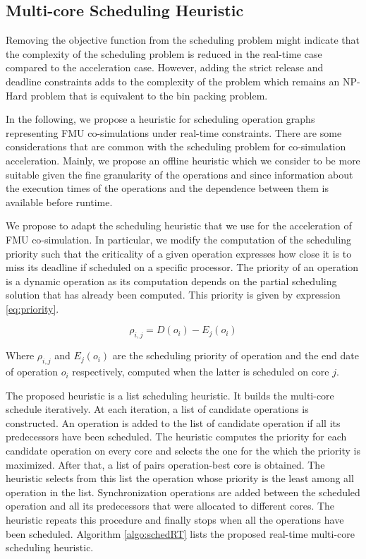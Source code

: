 \subsection{Multi-core Scheduling Heuristic}

Removing the objective function from the scheduling problem might indicate that the complexity of the scheduling problem is reduced in the real-time case compared to the acceleration case. However, adding the strict release and deadline constraints adds to the complexity of the problem which remains an NP-Hard problem that is equivalent to the bin packing problem.

In the following, we propose a heuristic for scheduling operation graphs representing FMU co-simulations under real-time constraints. There are some considerations that are common with the scheduling problem for co-simulation acceleration. Mainly, we propose an offline heuristic which we consider to be more suitable given the fine granularity of the operations and since information about the execution times of the operations and the dependence between them is available before runtime.

We propose to adapt the scheduling heuristic that we use for the acceleration of FMU co-simulation. In particular, we modify the computation of the scheduling priority such that the criticality of a given operation expresses how close it is to miss its deadline if scheduled on a specific processor. The priority of an operation is a dynamic operation as its computation depends on the partial scheduling solution that has already been computed. This priority is given by expression \ref{eq:priority}.

\begin{equation}
\rho_{i,j} = D(o_i) - E_j(o_i)
\label{eq:priority}
\end{equation}

Where $\rho_{i,j}$ and $E_j(o_i)$ are the scheduling priority of operation and the end date of operation $o_i$ respectively, computed when the latter is scheduled on core $j$.

The proposed heuristic is a list scheduling heuristic. It builds the multi-core schedule iteratively. At each iteration, a list of candidate operations is constructed. An operation is added to the list of candidate operation if all its predecessors have been scheduled. The heuristic computes the priority for each candidate operation on every core and selects the one for the which the priority is maximized. After that, a list of pairs operation-best core is obtained. The heuristic selects from this list the operation whose priority is the least among all operation in the list. Synchronization operations are added between the scheduled operation and all its predecessors that were allocated to different cores. The heuristic repeats this procedure and finally stops when all the operations have been scheduled. Algorithm \ref{algo:schedRT} lists the proposed real-time multi-core scheduling heuristic. 

